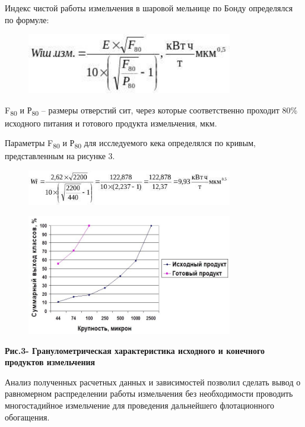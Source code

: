Индекс чистой работы измельчения в шаровой мельнице по Бонду определялся
по формуле:

\begin{figure}[H]
	\centering
	\includegraphics[width=0.8\textwidth]{assets/1040}
	\caption*{}
\end{figure}

F\textsubscript{80} и Р\textsubscript{80} -- размеры отверстий сит,
через которые соответственно проходит 80\% исходного питания и готового
продукта измельчения, мкм.

Параметры F\textsubscript{80} и Р\textsubscript{80} для исследуемого
кека определялся по кривым, представленным на рисунке 3.

\begin{figure}[H]
	\centering
	\includegraphics[width=0.8\textwidth]{assets/1041}
	\caption*{}
\end{figure}

\begin{figure}[H]
	\centering
	\includegraphics[width=0.8\textwidth]{assets/1042}
	\caption*{}
\end{figure}

\textbf{Рис.3- Гранулометрическая характеристика исходного и конечного
продуктов измельчения}

Анализ полученных расчетных данных и зависимостей позволил сделать вывод
о равномерном распределении работы измельчения без необходимости
проводить многостадийное измельчение для проведения дальнейшего
флотационного обогащения.

